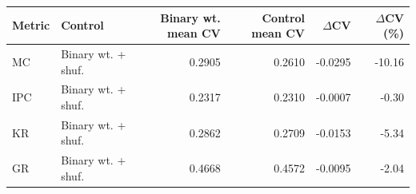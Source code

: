 \begin{tabular}{llrrrr}
\toprule
Metric & Control & Binary wt. mean CV & Control mean CV & $\Delta$CV & $\Delta$CV (\%) \\
\midrule
MC & Binary wt. + shuf. & 0.2905 & 0.2610 & -0.0295 & -10.16 \\
IPC & Binary wt. + shuf. & 0.2317 & 0.2310 & -0.0007 & -0.30 \\
KR & Binary wt. + shuf. & 0.2862 & 0.2709 & -0.0153 & -5.34 \\
GR & Binary wt. + shuf. & 0.4668 & 0.4572 & -0.0095 & -2.04 \\
\bottomrule
\end{tabular}
